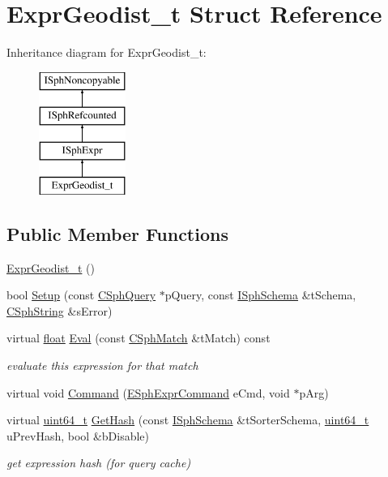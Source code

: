 \hypertarget{structExprGeodist__t}{\section{Expr\-Geodist\-\_\-t Struct Reference}
\label{structExprGeodist__t}
}
Inheritance diagram for Expr\-Geodist\-\_\-t\-:\begin{figure}[H]
\begin{center}
\leavevmode
\includegraphics[height=4.000000cm]{structExprGeodist__t}
\end{center}
\end{figure}
\subsection*{Public Member Functions}
\begin{DoxyCompactItemize}
\item 
\hyperlink{structExprGeodist__t_a1e441e2a450ef0187d23872353441211}{Expr\-Geodist\-\_\-t} ()
\item 
bool \hyperlink{structExprGeodist__t_ae6939c067032af5de223c4b54d1728d3}{Setup} (const \hyperlink{classCSphQuery}{C\-Sph\-Query} $\ast$p\-Query, const \hyperlink{classISphSchema}{I\-Sph\-Schema} \&t\-Schema, \hyperlink{structCSphString}{C\-Sph\-String} \&s\-Error)
\item 
virtual \hyperlink{sphinxexpr_8cpp_a0e0d0739f7035f18f949c2db2c6759ec}{float} \hyperlink{structExprGeodist__t_ade1804d01a3bfe8e75416dcaaf5ef0c8}{Eval} (const \hyperlink{classCSphMatch}{C\-Sph\-Match} \&t\-Match) const 
\begin{DoxyCompactList}\small\item\em evaluate this expression for that match \end{DoxyCompactList}\item 
virtual void \hyperlink{structExprGeodist__t_afaa7e006cb73f698ef8ec7efa2f449c8}{Command} (\hyperlink{sphinxexpr_8h_a30be184fb07bd80c271360fc6094c818}{E\-Sph\-Expr\-Command} e\-Cmd, void $\ast$p\-Arg)
\item 
virtual \hyperlink{sphinxstd_8h_aaa5d1cd013383c889537491c3cfd9aad}{uint64\-\_\-t} \hyperlink{structExprGeodist__t_a9577b169fb6583cafb28a246bbe81e58}{Get\-Hash} (const \hyperlink{classISphSchema}{I\-Sph\-Schema} \&t\-Sorter\-Schema, \hyperlink{sphinxstd_8h_aaa5d1cd013383c889537491c3cfd9aad}{uint64\-\_\-t} u\-Prev\-Hash, bool \&b\-Disable)
\begin{DoxyCompactList}\small\item\em get expression hash (for query cache) \end{DoxyCompactList}\end{DoxyCompactItemize}
